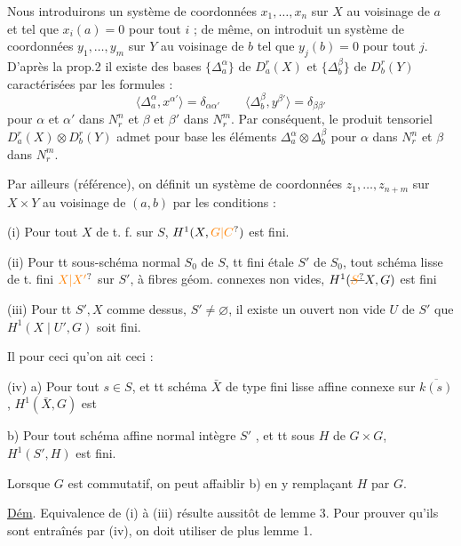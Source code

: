 Nous introduirons un système de coordonnées $x_1,\ldots,x_n$ sur $X$ au voisinage de $a$ et tel que $x_i(a)=0$ pour tout $i$ ; de même, on introduit un système de coordonnées $y_1,\ldots,y_m$ sur $Y$ au voisinage de $b$ tel que $y_j(b)=0$ pour tout $j$. D'après la prop.2 il existe des bases $\{\Delta_a^\alpha\}$ de $D_a^r(X)$ et $\{\Delta_b^\beta\}$ de $D_b^r(Y)$ caractérisées par les formules :
\[
\langle\Delta_a^\alpha,x^{\alpha'}\rangle=\delta_{\alpha\alpha'}\qquad
\langle\Delta_b^\beta,y^{\beta'}\rangle=\delta_{\beta\beta'}\tag*{(33)}
\]
pour $\alpha$ et $\alpha'$ dans $N_r^n$ et $\beta$ et $\beta'$ dans $N_r^m$. Par conséquent, le produit tensoriel $D_a^r(X)\otimes D_b^r(Y)$ admet pour base les éléments $\Delta_a^\alpha\otimes\Delta_b^\beta$ pour $\alpha$ dans $N_r^n$ et $\beta$ dans $N_r^m$.

Par ailleurs (référence), on définit un système de coordonnées $z_1,\ldots,z_{n+m}$ sur $X\times Y$ au voisinage de $(a,b)$ par les conditions :

(i) Pour tout $X$ de t. f. sur $S$, $H^1(X,\unsure{G|C})$ est fini.

(ii) Pour tt sous-schéma  normal   $S_0$ de $S$,  tt  fini étale $S'$ de $S_0$, tout schéma  lisse de t. fini $\unsure{X|X'}$ sur $S'$, à fibres géom. connexes non vides, $H^1(\deleted{\unsure{S}}X,G)$ est fini

(iii) Pour tt $S',X$ comme dessus, $S'\ne\varnothing$, il existe un ouvert non vide $U$ de $S'$  que $H^1(X\mid U',G)$ soit fini.

Il  pour ceci qu'on ait ceci :

(iv) a) Pour tout $s\in S$, et tt schéma $\bar X$ de type fini lisse affine connexe sur $\overline{k(s)}$, $H^1(\bar X,G)$ est 

b) Pour tout   schéma affine normal intègre $S'$ ,  et tt sous  $H$ de $G\times G$,  $H^1(S',H)$ est fini.

Lorsque $G$ est commutatif, on peut affaiblir b) en y remplaçant $H$ par $G$.

\margin{\rule{4em}{.4pt}}
\uline{Dém}. Equivalence de (i) à (iii) résulte aussitôt de lemme 3. Pour prouver qu'ils sont entraînés par (iv), on doit utiliser de plus lemme 1.

